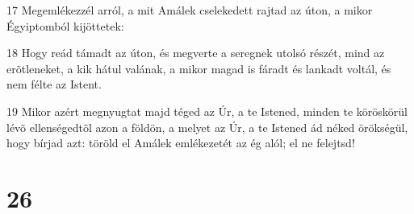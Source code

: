 \par 17 Megemlékezzél arról, a mit Amálek cselekedett rajtad az úton, a mikor Égyiptomból kijöttetek:
\par 18 Hogy reád támadt az úton, és megverte a seregnek utolsó részét, mind az erõtleneket, a kik hátul valának, a mikor magad is fáradt és lankadt voltál, és nem félte az Istent.
\par 19 Mikor azért megnyugtat majd téged az Úr, a te Istened, minden te köröskörül lévõ ellenségedtõl azon a földön, a melyet az Úr, a te Istened ád néked örökségül, hogy bírjad azt: töröld el Amálek emlékezetét az ég alól; el ne felejtsd!

\chapter{26}

